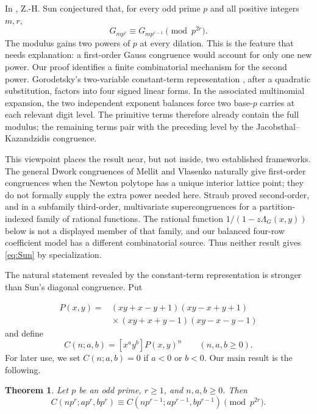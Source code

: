 \documentclass[11pt,reqno]{amsart}
\numberwithin{equation}{section}
\newtheorem{theorem}{Theorem}[section]
\theoremstyle{remark}
\begin{document}
In \cite[Conjecture~2.5]{Sun2020}, Z.-H. Sun conjectured that, for every
odd prime \(p\) and all positive integers \(m,r\),
\begin{equation}\label{eq:Sun}
G_{mp^r}\equiv G_{mp^{r-1}}\pmod {p^{2r}}.
\end{equation}
The modulus gains two powers of \(p\) at every dilation.  This is the feature
that needs explanation: a first-order Gauss congruence would account for only
one new power.  Our proof identifies a finite combinatorial mechanism for the
second power.  Gorodetsky's two-variable constant-term representation
\cite[Sec.~5]{GorodetskyV2}, after a quadratic substitution, factors into
four signed linear forms.  In the associated multinomial expansion, the two
independent exponent balances force two base-\(p\) carries at each relevant
digit level.  The primitive terms therefore already contain the full modulus;
the remaining terms pair with the preceding level by the
Jacobsthal--Kazandzidis congruence.

This viewpoint places the result near, but not inside, two established
frameworks.  The general Dwork congruences of Mellit and Vlasenko
\cite{MellitVlasenko} naturally give first-order congruences when the Newton
polytope has a unique interior lattice point; they do not formally supply the
extra power needed here.  Straub \cite{Straub2014} proved second-order, and
in a subfamily third-order, multivariate supercongruences for a
partition-indexed family of rational functions.  The rational function
\(1/(1-z\Lambda_G(x,y))\) below is not a displayed member of that family,
and our balanced four-row coefficient model has a different combinatorial
source.  Thus neither result gives \eqref{eq:Sun} by specialization.

The natural statement revealed by the constant-term representation is
stronger than Sun's diagonal congruence.  Put

\begin{equation}\label{eq:Pdef}
\begin{split}
P(x,y)={}&(xy+x-y+1)(xy-x+y+1)\\
&{}\times(xy+x+y-1)(xy-x-y-1)
\end{split}
\end{equation}
and define
\[
C(n;a,b)=[x^ay^b]P(x,y)^n
\qquad(n,a,b\geq0).
\]
For later use, we set \(C(n;a,b)=0\) if \(a<0\) or \(b<0\).
Our main result is the following.

\begin{theorem}\label{thm:multi}
Let \(p\) be an odd prime, \(r\geq1\), and \(n,a,b\geq0\).  Then
\begin{equation}\label{eq:multi}
C(np^r;ap^r,bp^r)
\equiv C(np^{r-1};ap^{r-1},bp^{r-1})
\pmod {p^{2r}}.
\end{equation}
\end{theorem}
\end{document}
